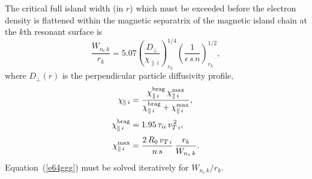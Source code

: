 \documentclass[notitlepage,12pt]{article}
\begin{document}
The critical full island width (in $r$) which must be exceeded before the electron density is flattened within the
magnetic separatrix of the magnetic island chain at the $k$th resonant surface is
\begin{equation}\label{e64ggg}
\frac{W_{n_e\,k} }{r_k}= 5.07\left(\frac{D_\perp}{\chi_{\parallel\,i}}\right)^{1/4}_{r_k}\left(\frac{1}{\epsilon\,s\,n}\right)^{1/2}_{r_k},
\end{equation}
where $D_\perp(r)$ is the perpendicular particle diffusivity profile, 
\begin{align}
\chi_{\parallel\,i}&= \frac{\chi_{\parallel\,i}^{\rm brag}\,\chi_{\parallel\,i}^{\rm max}}{\chi_{\parallel\,i}^{\rm brag}+\chi_{\parallel\,i}^{\rm max}},\\[0.5ex]
\chi_{\parallel\,i}^{\rm brag} &= 1.95\,\tau_{ii}\,v_{T\,i}^{\,2},\\[0.5ex]
\chi_{\parallel\,i}^{\rm max} &= \frac{2\,R_0\,v_{T\,i}}{n\,s}\,\frac{r_k}{W_{n_e\,k}}.
\end{align}
Equation~(\ref{e64ggg}) must be solved iteratively for $W_{n_e\,k}/r_k$.
\end{document}
